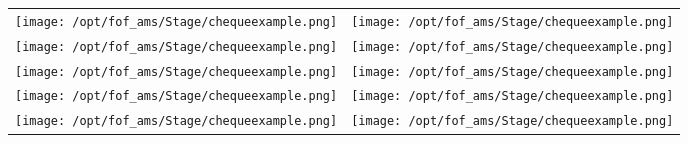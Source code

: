 \documentclass{article}%
\begin{document}
\begin{longtabu}{X[c] X[c]}
\texttt{[image: /opt/fof\_ams/Stage/chequeexample.png]}&\texttt{[image: /opt/fof\_ams/Stage/chequeexample.png]}\\%
\texttt{[image: /opt/fof\_ams/Stage/chequeexample.png]}&\texttt{[image: /opt/fof\_ams/Stage/chequeexample.png]}\\%
\texttt{[image: /opt/fof\_ams/Stage/chequeexample.png]}&\texttt{[image: /opt/fof\_ams/Stage/chequeexample.png]}\\%
\texttt{[image: /opt/fof\_ams/Stage/chequeexample.png]}&\texttt{[image: /opt/fof\_ams/Stage/chequeexample.png]}\\%
\texttt{[image: /opt/fof\_ams/Stage/chequeexample.png]}&\texttt{[image: /opt/fof\_ams/Stage/chequeexample.png]}\\%
\end{longtabu}%
\end{document}
